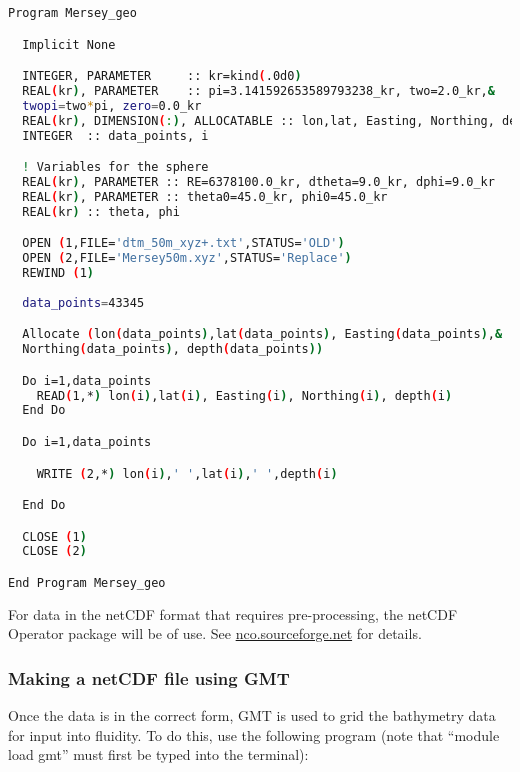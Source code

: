 \begin{lstlisting}[language = Bash]
 Program Mersey_geo 

  Implicit None 

  INTEGER, PARAMETER     :: kr=kind(.0d0) 
  REAL(kr), PARAMETER    :: pi=3.141592653589793238_kr, two=2.0_kr,&
  twopi=two*pi, zero=0.0_kr 
  REAL(kr), DIMENSION(:), ALLOCATABLE :: lon,lat, Easting, Northing, depth 
  INTEGER  :: data_points, i 

  ! Variables for the sphere 
  REAL(kr), PARAMETER :: RE=6378100.0_kr, dtheta=9.0_kr, dphi=9.0_kr 
  REAL(kr), PARAMETER :: theta0=45.0_kr, phi0=45.0_kr 
  REAL(kr) :: theta, phi 

  OPEN (1,FILE='dtm_50m_xyz+.txt',STATUS='OLD') 
  OPEN (2,FILE='Mersey50m.xyz',STATUS='Replace') 
  REWIND (1) 
  
  data_points=43345 

  Allocate (lon(data_points),lat(data_points), Easting(data_points),&
  Northing(data_points), depth(data_points)) 

  Do i=1,data_points 
    READ(1,*) lon(i),lat(i), Easting(i), Northing(i), depth(i) 
  End Do 

  Do i=1,data_points 

    WRITE (2,*) lon(i),' ',lat(i),' ',depth(i) 

  End Do 

  CLOSE (1) 
  CLOSE (2) 

End Program Mersey_geo 
\end{lstlisting}

For data in the netCDF format that requires pre-processing, the netCDF Operator package will be of use. See
\href{http://nco.sourceforge.net/}{nco.sourceforge.net} for details. 

\subsubsection{Making a netCDF file using GMT}

Once the data is in the correct form, GMT is used to grid the bathymetry data for input into 
fluidity. To do this, use the following program (note that “module load 
gmt” must first be typed into the terminal):

